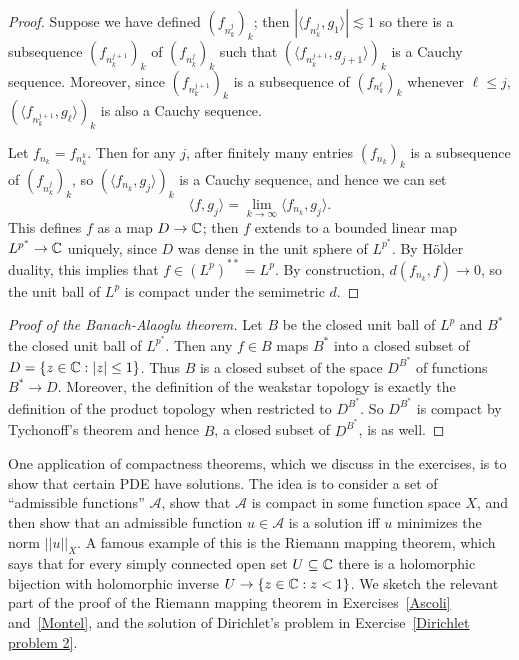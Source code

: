 \begin{proof}
Suppose we have defined $(f_{n_{k}^j})_{k}$; then $|\langle f_{n_{k}^j}, g_1\rangle| \lesssim 1$ so there is a subsequence $(f_{n_{k}^{j+1}})_{k}$ of $(f_{n_{k}^j})_{k}$ such that $(\langle f_{n_{k}^{j+1}}, g_{j+1}\rangle)_{k}$ is a Cauchy sequence.
Moreover, since $(f_{n_{k}^{j+1}})_{k}$ is a subsequence of $(f_{n_{k}^\ell})_{k}$ whenever $\ell \leq j$, $(\langle f_{n_{k}^{j+1}}, g_\ell\rangle)_{k}$ is also a Cauchy sequence.

Let $f_{n_{k}} = f_{n_{k}^k}$. Then for any $j$, after finitely many entries $(f_{n_{k}})_{k}$ is a subsequence of $(f_{n_{k}^j})_{k}$, so $(\langle f_{n_{k}}, g_{j}\rangle)_{k}$ is a Cauchy sequence, and hence we can set
\[\langle f, g_{j}\rangle = \lim_{k \to \infty} \langle f_{n_{k}}, g_{j}\rangle.\]
This defines $f$ as a map $D \to \mathbb{C}$; then $f$ extends to a bounded linear map $L^{p^*} \to \mathbb{C}$ uniquely, since $D$ was dense in the unit sphere of $L^{p^*}$.
By H\"older duality, this implies that $f \in (L^p)^{**} = L^p$.
By construction, $d(f_{n_{k}}, f) \to 0$, so the unit ball of $L^p$ is compact under the semimetric $d$.
\end{proof}

\begin{proof}[Proof of the Banach-Alaoglu theorem]
Let $B$ be the closed unit ball of $L^p$ and $B^*$ the closed unit ball of $L^{p^*}$.
Then any $f \in B$ maps $B^*$ into a closed subset of $D = \{z \in \mathbb{C}: |z| \leq 1\}$.
Thus $B$ is a closed subset of the space $D^{B^*}$ of functions $B^* \to D$.
Moreover, the definition of the weakstar topology is exactly the definition of the product topology when restricted to $D^{B^*}$.
So $D^{B^*}$ is compact by Tychonoff's theorem and hence $B$, a closed subset of $D^{B^*}$, is as well.
\end{proof}

One application of compactness theorems, which we discuss in the exercises, is to show that certain PDE have solutions.
The idea is to consider a set of ``admissible functions'' $\mathcal A$, show that $\mathcal A$ is compact in some function space $X$, and then show that an admissible function $u \in \mathcal A$ is a solution iff $u$ minimizes the norm $||u||_X$.
A famous example of this is the Riemann mapping theorem, which says that for every simply connected open set $U \subseteq \mathbb{C}$ there is a holomorphic bijection with holomorphic inverse $U \to \{z \in \mathbb{C}: z < 1\}$.
We sketch the relevant part of the proof of the Riemann mapping theorem in Exercises~\ref{Ascoli} and~\ref{Montel}, and the solution of Dirichlet's problem in Exercise~\ref{Dirichlet problem 2}.


